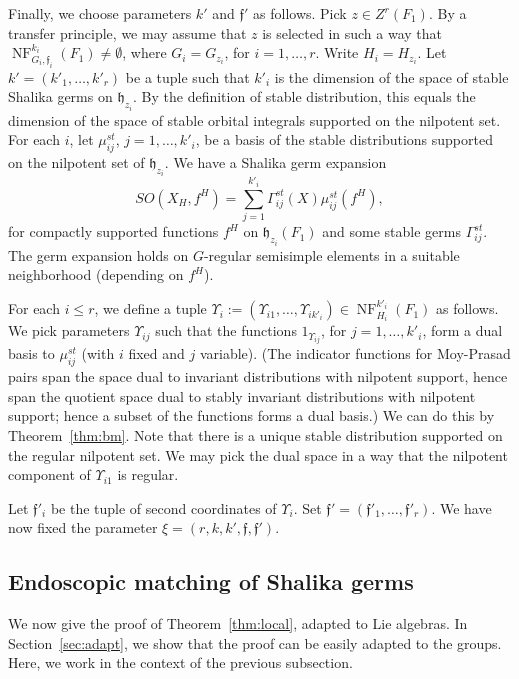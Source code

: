 \documentclass[12pt]{amsart}
\newcommand{\op}[1]{\operatorname{#1}}
\def\NF{\op{NF}}
\def\Y{\Upsilon}
\def\s{{\mathfrak{f}}}
\newcommand{\fh}{\mathfrak{h}}
\theoremstyle{plain}
\theoremstyle{definition}
\begin{document}
Finally, we choose parameters $k'$ and $\s'$ as follows.  Pick $z\in
Z^r(F_1)$.  By a transfer principle, we may assume that $z$ is
selected in such a way that $\NF^{k_i}_{G_i,\s_i}(F_1)\ne \emptyset$,
where $G_i=G_{z_i}$, for $i=1,\ldots,r$.  Write $H_i = H_{z_i}$. Let
$k'=(k'_1,\ldots,k'_r)$ be a tuple such that $k'_i$ is the dimension
of the space of stable Shalika germs on $\fh_{z_i}$.  By the
definition of stable distribution, this equals the dimension of the
space of stable orbital integrals supported on the nilpotent set.  For
each $i$, let $\mu_{ij}^{st}$, $j = 1,\ldots,k'_i$, be a basis of the
stable distributions supported on the nilpotent set of $\fh_{z_i}$.
We have a Shalika germ expansion
\[
SO(X_H,f^H) = \sum_{j=1}^{k'_i} \Gamma^{st}_{ij}(X) \mu_{ij}^{st}(f^H),
\]
for compactly supported functions $f^H$ on $\fh_{z_i}(F_1)$ and some
stable germs $\Gamma^{st}_{ij}$.  The germ expansion holds on $G$-regular
semisimple elements in a suitable neighborhood (depending on $f^H$).

For each $i\le r$, we define a tuple $\Y_i :=
(\Y_{i1},\ldots,\Y_{ik'_i})\in \NF^{k'_i}_{H_{i}}(F_1)$ as follows.
We pick parameters $\Y_{ij}$ such that the functions $1_{\Y_{ij}}$,
for $j=1,\ldots,k'_i$, form a dual basis to $\mu_{ij}^{st}$ (with $i$
fixed and $j$ variable).  (The indicator functions for Moy-Prasad
pairs span the space dual to invariant distributions with nilpotent
support, hence span the quotient space dual to stably invariant
distributions with nilpotent support; hence a subset of the functions
forms a dual basis.)  We can do this by Theorem~\ref{thm:bm}.  Note
that there is a unique stable distribution supported on the regular
nilpotent set.  We may pick the dual space in a way that the nilpotent
component of $\Y_{i1}$ is regular.

Let $\s'_i$ be the tuple of second coordinates of $\Y_i$.
Set $\s' = (\s'_1,\ldots,\s'_r)$.  We have now fixed the parameter
$\xi=(r,k,k',\s,\s')$.
 
\subsection{Endoscopic matching of Shalika germs}\label{sec:emsg}

We now give the proof of Theorem~\ref{thm:local}, adapted to Lie
algebras.  In Section~\ref{sec:adapt}, we show that the proof can be
easily adapted to the groups.  Here, we work in the context of the
previous subsection.
\end{document}
